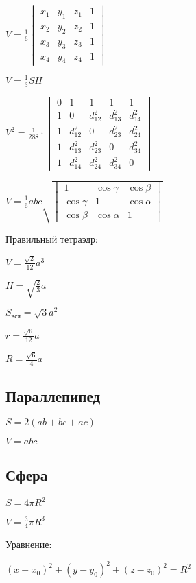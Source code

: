 $ V = \frac{1}{6} \begin{vmatrix}
	x_1 & y_1 & z_1 & 1 \\
	x_2 & y_2 & z_2 & 1 \\
	x_3 & y_3 & z_3 & 1 \\
	x_4 & y_4 & z_4 & 1
\end{vmatrix} $

$ V = \frac13 S H $

$ V^2 = \frac{1}{288}\cdot
\begin{vmatrix}
  0 & 1        & 1        & 1        & 1        \\
  1 & 0        & d_{12}^2 & d_{13}^2 & d_{14}^2 \\
  1 & d_{12}^2 & 0        & d_{23}^2 & d_{24}^2 \\
  1 & d_{13}^2 & d_{23}^2 & 0        & d_{34}^2 \\
  1 & d_{14}^2 & d_{24}^2 & d_{34}^2 & 0
\end{vmatrix} $

$ V = \frac16 abc \sqrt{\begin{vmatrix}
  1 & \cos \gamma  & \cos \beta \\
  \cos \gamma & 1 & \cos \alpha \\
  \cos \beta & \cos \alpha & 1         
\end{vmatrix}} $

Правильный тетраэдр:

$ V = \frac{\sqrt{2}}{12} a^3 $

$ H = \sqrt{\frac{2}{3}} a $

$ S_\text{вся} = \sqrt{3} a^2 $

$ r = \frac{\sqrt{6}}{12} a $

$ R = \frac{\sqrt{6}}{4} a $

\subsection{Параллепипед}

$ S = 2(ab + bc + ac) $

$ V = abc $

\subsection{Сфера}

$ S = 4 \pi R^2 $ 

$ V = \frac{3}{4} \pi R^3 $

Уравнение:

$ (x-x_0)^2 + (y-y_0)^2 + (z-z_0)^2 = R^2 $

